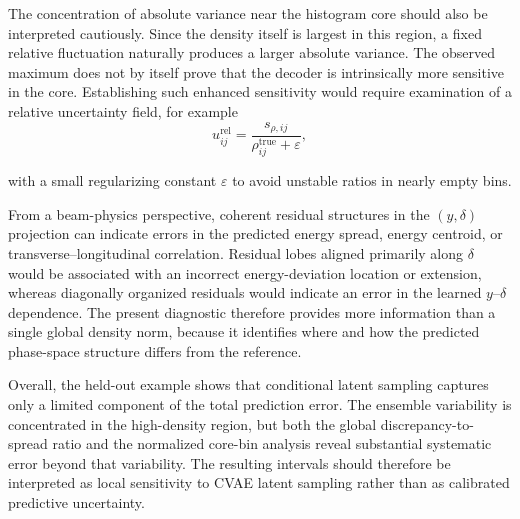 The concentration of absolute variance near the histogram core should also be interpreted cautiously. Since the density itself is largest in this region, a fixed relative fluctuation naturally produces a larger absolute variance. The observed maximum does not by itself prove that the decoder is intrinsically more sensitive in the core. Establishing such enhanced sensitivity would require examination of a relative uncertainty field, for example
\begin{equation}
    u_{ij}^{\mathrm{rel}}
    =
    \frac{
        s_{\rho,ij}
    }{
        \rho_{ij}^{\mathrm{true}}+\varepsilon
    },
\end{equation}
    
with a small regularizing constant \(\varepsilon\) to avoid unstable ratios in nearly empty bins.

From a beam-physics perspective, coherent residual structures in the \((y,\delta)\) projection can indicate errors in the predicted energy spread, energy centroid, or transverse--longitudinal correlation. Residual lobes aligned primarily along \(\delta\) would be associated with an incorrect energy-deviation location or extension, whereas diagonally organized residuals would indicate an error in the learned \(y\)--\(\delta\) dependence. The present diagnostic therefore provides more information than a single global density norm, because it identifies where and how the predicted phase-space structure differs from the reference.

Overall, the held-out example shows that conditional latent sampling captures only a limited component of the total prediction error. The ensemble variability is concentrated in the high-density region, but both the global discrepancy-to-spread ratio and the normalized core-bin  analysis reveal substantial systematic error beyond that variability. The resulting intervals should therefore be interpreted as local sensitivity to CVAE latent sampling rather than as calibrated predictive uncertainty.